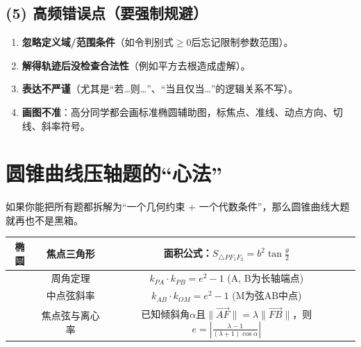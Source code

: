 \documentclass{article}
\begin{document}
	\subsection*{(5) 高频错误点（要强制规避）}
	
	\begin{enumerate}[label=\arabic*.]
		\item \textbf{忽略定义域/范围条件}（如令判别式$\geq 0$后忘记限制参数范围）。
		\item \textbf{解得轨迹后没检查合法性}（例如平方去根造成虚解）。
		\item \textbf{表达不严谨}（尤其是``若…则…''、``当且仅当…''的逻辑关系不写）。
		\item \textbf{画图不准}：高分同学都会画标准椭圆辅助图，标焦点、准线、动点方向、切线、斜率符号。
	\end{enumerate}
	

	
	\section{圆锥曲线压轴题的``心法''}
	
	\begin{center}
	\end{center}
	
	如果你能把所有题都拆解为``一个几何约束 + 一个代数条件''，那么圆锥曲线大题就再也不是黑箱。
	
	
	\begin{table}[h]
		\centering
		\begin{tabular}{|c|c|c|c|}
			\hline
			\textbf{椭圆} & 焦点三角形 & 面积公式：$S_{\triangle PF_1F_2} = b^2 \tan \frac{\theta}{2}$ & \\
			\hline
			& 周角定理 & $k_{PA} \cdot k_{PB} = e^2 - 1$ (A, B为长轴端点) & \\
			\hline
			& 中点弦斜率 & $k_{AB} \cdot k_{OM} = e^2 - 1$ (M为弦AB中点) & \\
			\hline
			& 焦点弦与离心率 & 已知倾斜角$\alpha$且$\|\overrightarrow{AF}\| = \lambda \|\overrightarrow{FB}\|$，则$e=\left|\frac{\lambda-1}{(\lambda+1)\cos\alpha}\right|$ & \\
			\hline
		\end{tabular}
	\end{table}
	
\end{document}
